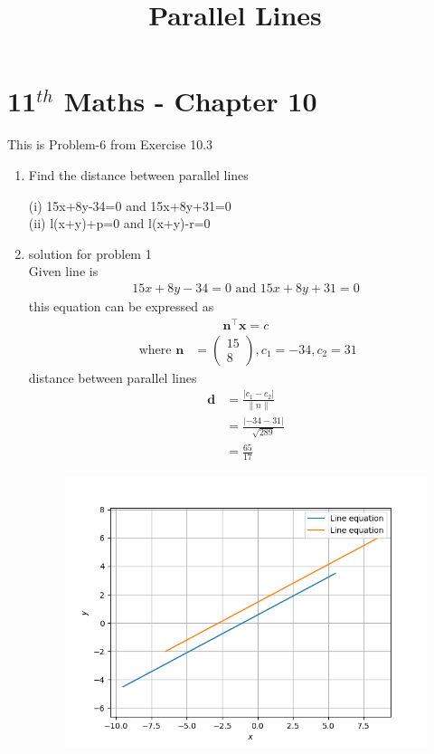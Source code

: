 \documentclass[12pt]{article}
\providecommand{\abs}[1]{\left\vert#1\right\vert}
\providecommand{\norm}[1]{\left\lVert#1\right\rVert}
\newcommand{\myvec}[1]{\ensuremath{\begin{pmatrix}#1\end{pmatrix}}}
\let\vec\mathbf
\begin{document}
\begin{center}
\title{\textbf{Parallel Lines}}
\date{\vspace{-5ex}} %
\maketitle
\end{center}
\setcounter{page}{1}
\section*{11$^{th}$ Maths - Chapter 10}
This is Problem-6 from Exercise 10.3
\begin{enumerate}
	\item Find the distance between parallel lines 
	
(i) 15x+8y-34=0 and  15x+8y+31=0 \\
(ii) l(x+y)+p=0 and  l(x+y)-r=0
\	
\item solution for problem 1
\\
Given line is 
\begin{align}
	15x+8y-34=0\text{ and }15x+8y+31=0
\end{align}
this equation can be expressed as 
\begin{align}
	\vec{n}^{\top}\vec{x}=c	
\end{align}
\begin{align}
\text{ where }\vec{n} &= \myvec{15 \\8}, c_1=-34, c_2= 31
\end{align} 
distance between parallel lines 
\begin{align}
\vec{d}&=\frac{\abs{c_1-c_2}}{\norm{n}}\\
&=\frac{\abs{-34-31}}{\sqrt{289}}\\
&=\frac{65}{17}
\end{align}
\begin{figure}[h!]
\begin{center}
\includegraphics[width=\columnwidth]{para.png}

\end{center}
\end{figure}
\end{enumerate}
\end{document}
